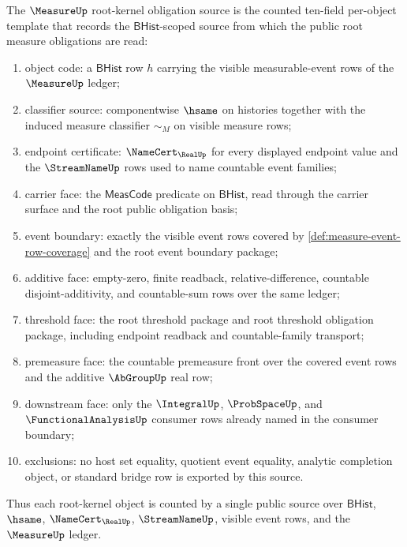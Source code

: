 \begin{definition}
\label{def:measure-root-kernel-obligation-source}
The $\MeasureUp$ root-kernel obligation source is the counted ten-field
per-object template that records the $\mathsf{BHist}$-scoped source from
which the public root measure obligations are read:
\begin{enumerate}
  \item object code: a $\mathsf{BHist}$ row $h$ carrying the visible
  measurable-event rows of the $\MeasureUp$ ledger;
  \item classifier source: componentwise $\hsame$ on histories together with
  the induced measure classifier $\sim_M$ on visible measure rows;
  \item endpoint certificate: $\NameCert_{\RealUp}$ for every displayed
  endpoint value and the $\StreamNameUp$ rows used to name countable event
  families;
  \item carrier face: the $\mathsf{MeasCode}$ predicate on
  $\mathsf{BHist}$, read through the carrier surface and the root public
  obligation basis;
  \item event boundary: exactly the visible event rows covered by
  \autoref{def:measure-event-row-coverage} and the root event boundary
  package;
  \item additive face: empty-zero, finite readback, relative-difference,
  countable disjoint-additivity, and countable-sum rows over the same
  ledger;
  \item threshold face: the root threshold package and root threshold
  obligation package, including endpoint readback and countable-family
  transport;
  \item premeasure face: the countable premeasure front over the covered
  event rows and the additive $\AbGroupUp$ real row;
  \item downstream face: only the $\IntegralUp$, $\ProbSpaceUp$, and
  $\FunctionalAnalysisUp$ consumer rows already named in the consumer
  boundary;
  \item exclusions: no host set equality, quotient event equality, analytic
  completion object, or standard bridge row is exported by this source.
\end{enumerate}
Thus each root-kernel object is counted by a single public source over
$\mathsf{BHist}$, $\hsame$, $\NameCert_{\RealUp}$, $\StreamNameUp$, visible
event rows, and the $\MeasureUp$ ledger.
\end{definition}

